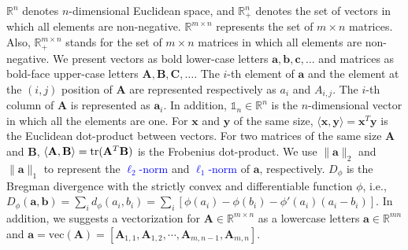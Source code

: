\documentclass[twoside]{article}
\theoremstyle{plain}
\newcommand{\one}{\mathds{1}}
\newcommand{\mat}[1]{\mathbf{#1}}
\renewcommand{\vec}[1]{\bm{#1}}
\newcommand{\changeXS}[1]{\textcolor{blue}{#1}}
\begin{document}
$\mathbb{R}^n$ denotes $n$-dimensional Euclidean space, and $\mathbb{R}^n_+$ denotes the set of vectors in which all elements are non-negative. $\mathbb{R}^{m \times n}$ represents the set of $m \times n$ matrices. Also, $\mathbb{R}^{m \times n}_+$ stands for the set of $m \times n$ matrices in which all elements are non-negative. We present vectors as bold lower-case letters $\vec{a},\vec{b},\vec{c},\dots$ and matrices as bold-face upper-case letters $\mat{A},\mat{B},\mat{C},\dots$. The $i$-th element of $\vec{a}$ and the element at the $(i,j)$ position of $\mat{A}$ are represented respectively as $a_i$ and ${A}_{i,j}$. The $i$-th column of $\mat{A}$ is represented as $\vec{a}_i$. In addition, $\one_n \in \mathbb{R}^n$ is the $n$-dimensional vector in which all the elements are one. For $\vec{x}$ and $\vec{y}$ of the same size, $\langle \vec{x},\vec{y} \rangle = \vec{x}^T\vec{y}$ is the Euclidean dot-product between vectors. For two matrices of the same size $\mat{A}$ and $\mat{B}$, $\langle \mat{A},\mat{B}\rangle={\rm tr}(\mat{A}^T\mat{B})$ is the Frobenius dot-product. We use $\|\vec{a}\|_2$ and $\|\vec{a}\|_1$ to represent the \changeXS{$\ell_2$-norm} and \changeXS{$\ell_1$-norm} of $\vec{a}$, respectively. 
$D_\phi$ is the Bregman divergence with the strictly convex and differentiable function $\phi$, i.e., $D_\phi(\vec{a},\vec{b})=\sum_{i} d_\phi(a_i, b_i)=\sum_i [\phi(a_i) - \phi(b_i) - \phi'(a_i)(a_i -b_i)]$. In addition, we suggests a vectorization for $\mat{A} \in \mathbb{R}^{m \times n}$ as a lowercase letters $\vec{a} \in \mathbb{R}^{mn}$ and $\vec{a}=\text{vec}(\mat{A})=[\mat{A}_{1,1}, \mat{A}_{1,2}, \cdots, \mat{A}_{m,n-1}, \mat{A}_{m,n}]$.
 
\end{document}
